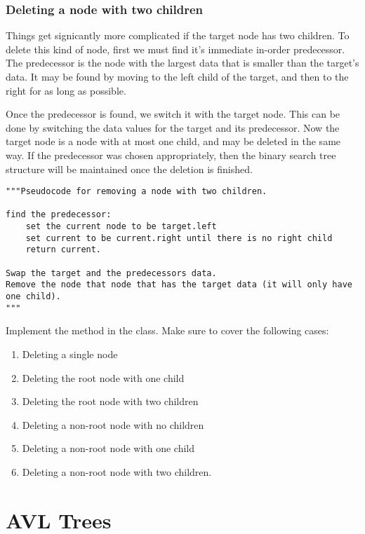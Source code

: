 \subsubsection*{Deleting a node with two children}

Things get signicantly more complicated if the target node has two children.
To delete this kind of node, first we must find it's immediate in-order predecessor.
The predecessor is the node with the largest data that is smaller than the target's data.
It may be found by moving to the left child of the target, and then to the right for as long as possible.

Once the predecessor is found, we switch it with the target node.
This can be done by switching the data values for the target and its predecessor.
Now the target node is a node with at most one child, and may be deleted in the same way.
If the predecessor was chosen appropriately, then the binary search tree structure will be maintained once the deletion is finished.

\begin{lstlisting}
"""Pseudocode for removing a node with two children.

find the predecessor:
	set the current node to be target.left
	set current to be current.right until there is no right child
	return current.

Swap the target and the predecessors data.
Remove the node that node that has the target data (it will only have one child).
"""
\end{lstlisting}
\begin{problem}

Implement the  method in the  class.
Make sure to cover the following cases:
\begin{enumerate}
\item Deleting a single node
\item Deleting the root node with one child
\item Deleting the root node with two children
\item Deleting a non-root node with no children
\item Deleting a non-root node with one child
\item Deleting a non-root node with two children.
\end{enumerate}

\end{problem}

\section*{AVL Trees}

